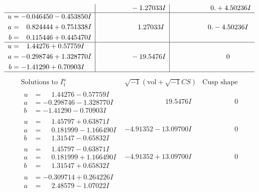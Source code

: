 \documentclass[1p]{elsarticle_modified}
\theoremstyle{definition}
\newcommand{\I}{\sqrt{-1}}
\begin{document}
$$\begin{array}{c|c|c}
 & \phantom{-0.000000 } -1.27033 I & \phantom{-0.000000 -}0. + 4.50236 I \\ \hline\begin{aligned}
u &= -0.046450 - 0.453850 I \\
a &= \phantom{-}0.824444 + 0.751338 I \\
b &= \phantom{-}0.115446 + 0.445470 I\end{aligned}
 & \phantom{-0.000000 -}1.27033 I & \phantom{-0.000000 } 0. - 4.50236 I \\ \hline\begin{aligned}
u &= \phantom{-}1.44276 + 0.57759 I \\
a &= -0.298746 + 1.328770 I \\
b &= -1.41290 + 0.70903 I\end{aligned}
 & \phantom{-0.000000 } -19.5476 I & \phantom{-0.000000 } 0\\
 \hline 
 \end{array}$$\newpage$$\begin{array}{c|c|c}  
\text{Solutions to }I^u_{1}& \I (\text{vol} + \sqrt{-1}CS) & \text{Cusp shape}\\
 \hline 
\begin{aligned}
u &= \phantom{-}1.44276 - 0.57759 I \\
a &= -0.298746 - 1.328770 I \\
b &= -1.41290 - 0.70903 I\end{aligned}
 & \phantom{-0.000000 -}19.5476 I & \phantom{-0.000000 } 0 \\ \hline\begin{aligned}
u &= \phantom{-}1.45797 + 0.63871 I \\
a &= \phantom{-}0.181999 - 1.166490 I \\
b &= \phantom{-}1.31547 - 0.65832 I\end{aligned}
 & -4.91352 - 13.09700 I & \phantom{-0.000000 } 0 \\ \hline\begin{aligned}
u &= \phantom{-}1.45797 - 0.63871 I \\
a &= \phantom{-}0.181999 + 1.166490 I \\
b &= \phantom{-}1.31547 + 0.65832 I\end{aligned}
 & -4.91352 + 13.09700 I & \phantom{-0.000000 } 0 \\ \hline\begin{aligned}
u &= -0.309714 + 0.264226 I \\
a &= \phantom{-}2.48579 - 1.07022 I \\

\end{aligned}
\end{array}$$
\end{document}

